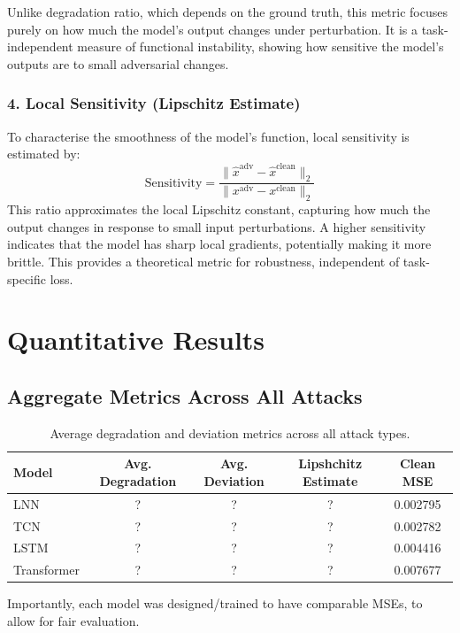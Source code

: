 Unlike degradation ratio, which depends on the ground truth, this metric focuses purely on how much the model's output changes under perturbation. It is a task-independent measure of functional instability, showing how sensitive the model's outputs are to small adversarial changes.

\subsubsection*{4. Local Sensitivity (Lipschitz Estimate)}
To characterise the smoothness of the model's function, local sensitivity is estimated by:
\[
\text{Sensitivity} = \frac{\| \hat{x}^{\text{adv}} - \hat{x}^{\text{clean}} \|_2}{\| x^{\text{adv}} - x^{\text{clean}} \|_2}
\]
This ratio approximates the local Lipschitz constant, capturing how much the output changes in response to small input perturbations. A higher sensitivity indicates that the model has sharp local gradients, potentially making it more brittle. This provides a theoretical metric for robustness, independent of task-specific loss.

\section{Quantitative Results}

\subsection*{Aggregate Metrics Across All Attacks}

\begin{table}[H]
\centering
\begin{tabular}{|l|c|c|c|c|}
\hline
\textbf{Model} & \textbf{Avg. Degradation} & \textbf{Avg. Deviation} & \textbf{Lipshchitz Estimate} & \textbf{Clean MSE} \\
\hline
LNN         & ? & ? & ? & 0.002795 \\
TCN        & ? & ? & ? & 0.002782 \\
LSTM         & ? & ? & ? & 0.004416 \\
Transformer & ? & ? & ? & 0.007677 \\ 
\hline
\end{tabular}
\caption{Average degradation and deviation metrics across all attack types.}
\label{tab:agg_metrics}
\end{table}

Importantly, each model was designed/trained to have comparable MSEs, to allow for fair evaluation.

